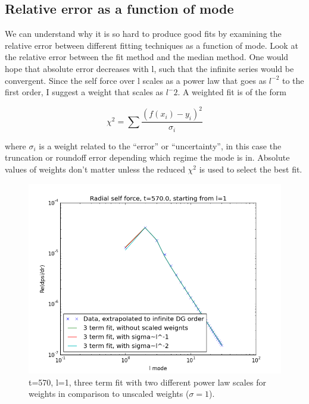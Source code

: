 
\subsection{Relative error as a function of mode}
We can understand why it is so hard to produce good fits by examining the relative error between different fitting techniques as a function of mode. Look at the relative error between the fit method and the median method. One would hope that absolute error decreases with l, such that the infinite series would be convergent. Since the self force over l scales as a power law that goes as $l^{-2}$ to the first order, I suggest a weight that scales as $l^-{2}$. A weighted fit is of the form

\begin{equation}
  \chi^2=\sum\frac{(f(x_i)-y_i)^2}{\sigma_i}
\end{equation}

where $\sigma_i$ is a weight related to the ``error'' or ``uncertainty'', in this case the truncation or roundoff error depending which regime the mode is in. Absolute values of weights don't matter unless the reduced $\chi^2$ is used to select the best fit. 



\begin{figure}
  \includegraphics{fiterrscalecorrect3term570l1}
  \caption{t=570, l=1, three term fit with two different power law scales for weights in comparison to unscaled weights ($\sigma=1$).}
\end{figure}


